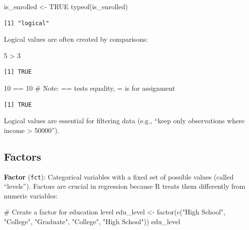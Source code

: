 \documentclass[
  letterpaper,
  DIV=11,
  numbers=noendperiod]{scrreprt}
\newenvironment{Shaded}{\begin{snugshade}}{\end{snugshade}}
\newcommand{\CommentTok}[1]{\textcolor[rgb]{0.37,0.37,0.37}{#1}}
\newcommand{\ConstantTok}[1]{\textcolor[rgb]{0.56,0.35,0.01}{#1}}
\newcommand{\DecValTok}[1]{\textcolor[rgb]{0.68,0.00,0.00}{#1}}
\newcommand{\FunctionTok}[1]{\textcolor[rgb]{0.28,0.35,0.67}{#1}}
\newcommand{\NormalTok}[1]{\textcolor[rgb]{0.00,0.23,0.31}{#1}}
\newcommand{\OtherTok}[1]{\textcolor[rgb]{0.00,0.23,0.31}{#1}}
\newcommand{\SpecialCharTok}[1]{\textcolor[rgb]{0.37,0.37,0.37}{#1}}
\newcommand{\StringTok}[1]{\textcolor[rgb]{0.13,0.47,0.30}{#1}}
\begin{document}
\begin{Shaded}
\begin{Highlighting}[]
\NormalTok{is\_enrolled }\OtherTok{\textless{}{-}} \ConstantTok{TRUE}
\FunctionTok{typeof}\NormalTok{(is\_enrolled)}
\end{Highlighting}
\end{Shaded}

\begin{verbatim}
[1] "logical"
\end{verbatim}

Logical values are often created by comparisons:

\begin{Shaded}
\begin{Highlighting}[]
\DecValTok{5} \SpecialCharTok{\textgreater{}} \DecValTok{3}
\end{Highlighting}
\end{Shaded}

\begin{verbatim}
[1] TRUE
\end{verbatim}

\begin{Shaded}
\begin{Highlighting}[]
\DecValTok{10} \SpecialCharTok{==} \DecValTok{10}  \CommentTok{\# Note: == tests equality, = is for assignment}
\end{Highlighting}
\end{Shaded}

\begin{verbatim}
[1] TRUE
\end{verbatim}

Logical values are essential for filtering data (e.g., ``keep only
observations where income \textgreater{} 50000'').

\subsection{Factors}\label{factors}

\textbf{Factor} (\texttt{fct}): Categorical variables with a fixed set
of possible values (called ``levels''). Factors are crucial in
regression because R treats them differently from numeric variables:

\begin{Shaded}
\begin{Highlighting}[]
\CommentTok{\# Create a factor for education level}
\NormalTok{edu\_level }\OtherTok{\textless{}{-}} \FunctionTok{factor}\NormalTok{(}\FunctionTok{c}\NormalTok{(}\StringTok{"High School"}\NormalTok{, }\StringTok{"College"}\NormalTok{, }\StringTok{"Graduate"}\NormalTok{, }\StringTok{"College"}\NormalTok{, }\StringTok{"High School"}\NormalTok{))}
\NormalTok{edu\_level}
\end{Highlighting}
\end{Shaded}
\end{document}
